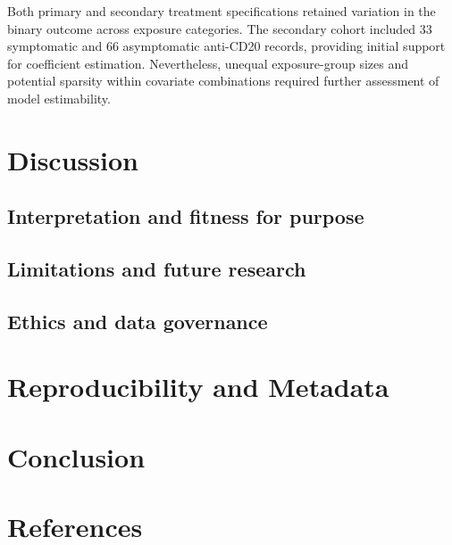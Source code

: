 \documentclass[
  british,
]{article}
\begin{document}
Both primary and secondary treatment specifications retained variation
in the binary outcome across exposure categories. The secondary cohort
included 33 symptomatic and 66 asymptomatic anti-CD20 records, providing
initial support for coefficient estimation. Nevertheless, unequal
exposure-group sizes and potential sparsity within covariate
combinations required further assessment of model estimability.

\section{Discussion}\label{discussion}

\subsection{Interpretation and fitness for
purpose}\label{interpretation-and-fitness-for-purpose}

\subsection{Limitations and future
research}\label{limitations-and-future-research}

\subsection{Ethics and data
governance}\label{ethics-and-data-governance}

\section{Reproducibility and
Metadata}\label{reproducibility-and-metadata}

\section{Conclusion}\label{conclusion}

\section*{References}\label{references}
\end{document}
